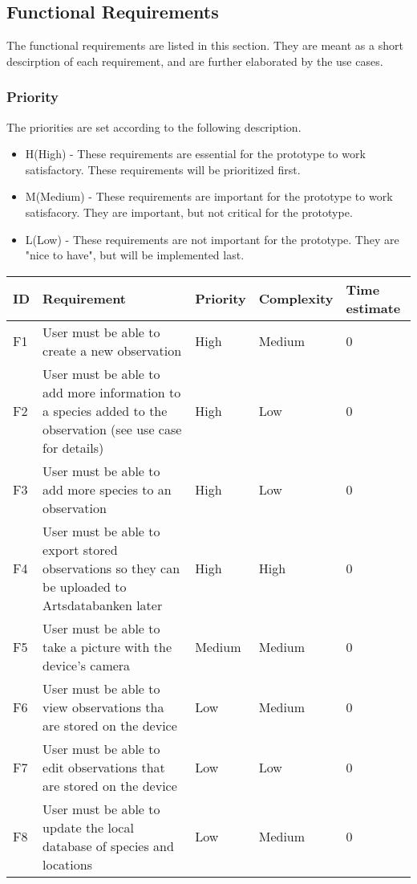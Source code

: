 \subsection{Functional Requirements}
The functional requirements are listed in this section. They are meant as a short descirption of each requirement, and are further elaborated by the use cases.

\subsubsection{Priority}
The priorities are set according to the following description.
\begin{itemize}
 \item H(High) - These requirements are essential for the prototype to work satisfactory. These requirements will be prioritized first.
 \item M(Medium) - These requirements are important for the prototype to work satisfacory. They are important, but not critical for the prototype.
 \item L(Low) - These requirements are not important for the prototype. They are "nice to have", but will be implemented last.
\end{itemize}

\begin{tabular}[t]{|l|p{}|l|l|p{}|}\hline
\bf ID&\bf Requirement& \bf Priority& \bf Complexity&\bf Time estimate\\\hline
F1&User must be able to create a new observation &High&Medium&0\\\hline
F2&User must be able to add more information to a species added to the observation (see use case for details) &High&Low&0\\\hline
F3&User must be able to add more species to an observation &High&Low&0\\\hline
F4&User must be able to export stored observations so they can be uploaded to Artsdatabanken later &High&High&0\\\hline
F5&User must be able to take a picture with the device's camera &Medium&Medium&0\\\hline
F6&User must be able to view observations tha are stored on the device &Low&Medium&0\\\hline
F7&User must be able to edit observations that are stored on the device &Low&Low&0\\\hline
F8&User must be able to update the local database of species and locations &Low&Medium&0\\\hline
\end{tabular}
